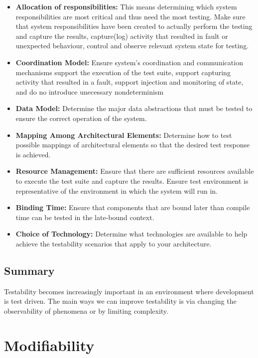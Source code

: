 \documentclass[a4paper]{report}
\begin{document}
\begin{itemize}
\item
\textbf{Allocation of responsibilities:}
This means determining which system responsibilities are most critical and thus need the most testing.
Make sure that system responsibilities have been created to actually perform the testing and capture the results, capture(log) activity that resulted in fault or unexpected behaviour, control and observe relevant system state for testing.

\item
\textbf{Coordination Model:}
Ensure system's coordination and communication mechanisms
support the execution of the test suite,
support capturing activity that resulted in a fault,
support injection and monitoring of state, and
do no introduce unecessary nondeterminism

\item
\textbf{Data Model:}
Determine the major data abstractions that must be tested to ensure the correct operation of the system.

\item
\textbf{Mapping Among Architectural Elements:}
Determine how to test possible mappings of architectural elements so that the desired test response is achieved.

\item
\textbf{Resource Management:}
Ensure that there are sufficient resources available to execute the test suite and capture the results. 
Ensure test environment is representative of the environment in which the system will run in.

\item
\textbf{Binding Time:}
Ensure that components that are bound later than compile time can be tested in the late-bound context.

\item
\textbf{Choice of Technology:}
Determine what technologies are available to help achieve the testability scenarios that apply to your architecture. 
\end{itemize}

\section{Summary}
Testability becomes increasingly important in an environment where development is test driven. The main ways we can improve testability is via changing the observability of phenomena or by limiting complexity.

\chapter{Modifiability}
\end{document}
